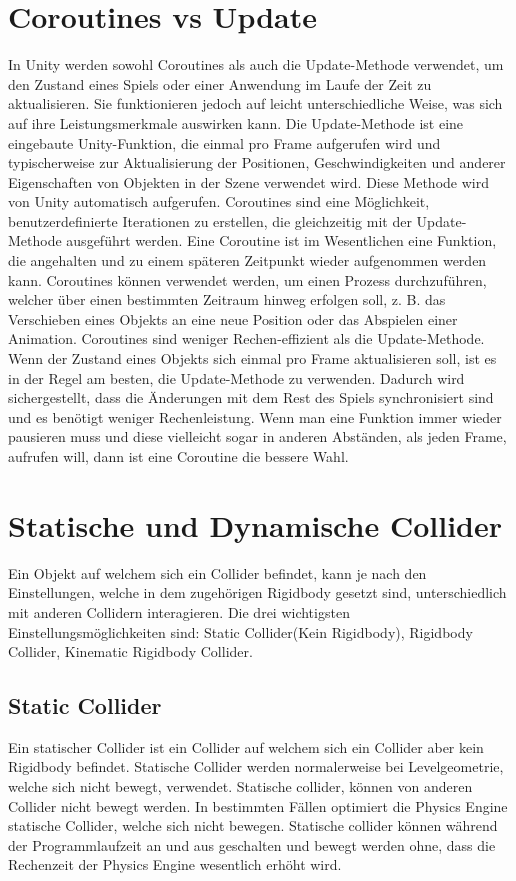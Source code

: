 \section{Coroutines vs Update}
In Unity werden sowohl Coroutines als auch die Update-Methode verwendet, um den Zustand eines Spiels oder einer Anwendung im Laufe der Zeit zu aktualisieren. Sie funktionieren jedoch auf leicht unterschiedliche Weise, was sich auf ihre Leistungsmerkmale auswirken kann. Die Update-Methode ist eine eingebaute Unity-Funktion, die einmal pro Frame aufgerufen wird und typischerweise zur Aktualisierung der Positionen, Geschwindigkeiten und anderer Eigenschaften von Objekten in der Szene verwendet wird. Diese Methode wird von Unity automatisch aufgerufen. Coroutines sind eine Möglichkeit, benutzerdefinierte Iterationen zu erstellen, die gleichzeitig mit der Update-Methode ausgeführt werden. Eine Coroutine ist im Wesentlichen eine Funktion, die angehalten und zu einem späteren Zeitpunkt wieder aufgenommen werden kann. Coroutines können verwendet werden, um einen Prozess durchzuführen, welcher über einen bestimmten Zeitraum hinweg erfolgen soll, z. B. das Verschieben eines Objekts an eine neue Position oder das Abspielen einer Animation. Coroutines sind weniger Rechen-effizient als die Update-Methode. Wenn der Zustand eines Objekts sich einmal pro Frame aktualisieren soll, ist es in der Regel am besten, die Update-Methode zu verwenden. Dadurch wird sichergestellt, dass die Änderungen mit dem Rest des Spiels synchronisiert sind und es benötigt weniger Rechenleistung. Wenn man eine Funktion immer wieder pausieren muss und diese vielleicht sogar in anderen Abständen, als jeden Frame, aufrufen will, dann ist eine Coroutine die bessere Wahl.
\cite{dickinson2015unity}

\section{Statische und Dynamische Collider}
Ein Objekt auf welchem sich ein Collider befindet, kann je nach den Einstellungen, welche in dem zugehörigen Rigidbody gesetzt sind, unterschiedlich mit anderen Collidern interagieren. Die drei wichtigsten Einstellungsmöglichkeiten sind: Static Collider(Kein Rigidbody), Rigidbody Collider, Kinematic Rigidbody Collider.

\subsection{Static Collider}
Ein statischer Collider ist ein Collider auf welchem sich ein Collider aber kein Rigidbody befindet. Statische Collider werden normalerweise bei Levelgeometrie, welche sich nicht bewegt, verwendet. Statische collider, können von anderen Collider nicht bewegt werden. In bestimmten Fällen optimiert die Physics Engine statische Collider, welche sich nicht bewegen. Statische collider können während der Programmlaufzeit an und aus geschalten und bewegt werden ohne, dass die Rechenzeit der Physics Engine wesentlich erhöht wird.


